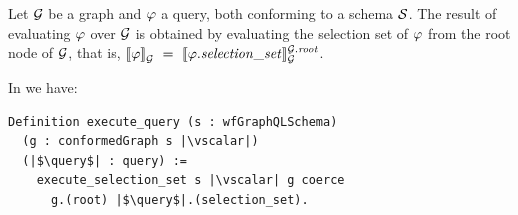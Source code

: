 \begin{definition}
Let $\mathcal{G}$ be a graph and $\varphi$ a query, both conforming to a schema $\mathcal{S}$. The result of
evaluating $\varphi$ over $\mathcal{G}$ is obtained by evaluating the
selection set of $\varphi$ from the root node of $\mathcal{G}$, that is, $\llbracket \varphi \rrbracket^{}_{\mathcal{G}}
~=~\llbracket \varphi.\mathit{selection\_set} \rrbracket^{\mathcal{G}.\mathit{root}}_{\mathcal{G}}$.
\end{definition}

In \gcoql we have:
\begin{verbatim}
Definition execute_query (s : wfGraphQLSchema)
  (g : conformedGraph s |\vscalar|)
  (|$\query$| : query) :=
    execute_selection_set s |\vscalar| g coerce
      g.(root) |$\query$|.(selection_set).
\end{verbatim}








